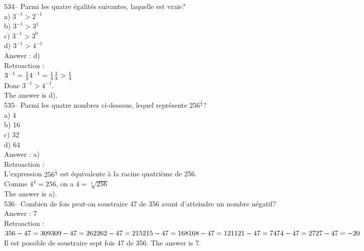 ﻿\documentclass[letterpaper, 12pt]{article}
\begin{document}
534-- Parmi les quatre \'egalit\'es suivantes, laquelle est vraie?\\
a) $3^{-1}>2^{-1}$\\
b) $3^{-1}>3^{1}$\\
c) $3^{-1}>3^{0}$\\
d) $3^{-1}>4^{-1}$\\

Answer : d)\\

Retroaction : \\
$3^{-1}=\frac{1}{3}\\[2mm]
4^{-1}=\frac{1}{4}\\[2mm]
\frac{1}{3}>\frac{1}{4}$\\[2mm]
Donc $3^{-1}>4^{-1}$.\\[2mm]
The answer is d).\\

535-- Parmi les quatre nombres ci-dessous, lequel repr\'esente
$256^{\frac{1}{4}}$?\\
a) 4\\
b) 16\\
c) 32\\
d) 64\\

Answer : a)\\

Retroaction : \\
L'expression $256^{\frac{1}{4}}$ est \'equivalente \`a la racine quatri\`eme
de 256.  \\
Comme $4^{4} = 256$, on a $4=\sqrt[4]{256}$ \\
The answer is a).\\

536-- Combien de fois peut-on soustraire 47 de 356 avant d'atteindre un
nombre n\'egatif?\\

Answer : 7\\

Retroaction : \\
$356-47=309\\
309-47=262\\
262-47=215\\
215-47=168\\
168-47=121\\
121-47=74\\
74-47=27\\
27-47=-20$\\
Il est possible de soustraire sept fois 47 de 356.  The answer is 7.\\
\end{document}
